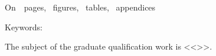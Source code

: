 


\printTheAbstract %


On~~pages, 
~figures, 
~tables,
~appendices%

{Keywords: \keywordsEn} %
	
The subject of the graduate qualification work is <<\thesisTitleEn>>.
	
	
\abstractEn %
	


\thispagestyle{empty}
%
